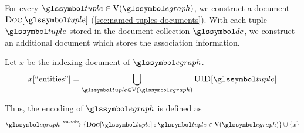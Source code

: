 		For every \(\tuple \in \text{V}(\egraph)\), we construct a document \(\docs{\tuple}\) (\vref{sec:named-tuples-documents}).  With each tuple \(\tuple\) stored in the document collection \(\dc\), we construct an additional document which stores the association information.
		
		Let \(x\) be the indexing document of \(\egraph\).
		\begin{align}
			x[\text{``entities''}] = \bigcup_{\tuple \in \text{V}\left(\egraph\right)} \uid{\tuple}
		\end{align}
		
		Thus, the encoding of \(\egraph\) is defined as
		\begin{align}
			\egraph \xrightarrow{\text{encode}} \{\docs{\tuple} : \tuple \in \text{V}(\egraph)\} \cup \{x\}
		\end{align}
		
